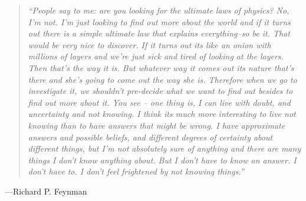 \begin{quote} 
\textit{``People say to me: are you looking for the ultimate laws of physics? No, I'm not. I'm just looking to find
out more about the world and if it turns out there is a simple ultimate law that explains everything--so be it. That would be very nice to discover. 
If it turns out its like an onion with millions of layers and we're just sick and tired of looking at the layers.
Then that's the way it is. But whatever way it comes out its nature that's there and she's going to come out the way she is. 
Therefore when we go to investigate it, we shouldn't pre-decide what we want to find out besides to find
out more about it.  You see -- one thing is, I can live with doubt, and uncertainty 
and not knowing. I think its much more interesting to live not knowing than to have answers that might be wrong. 
I have approximate answers and possible beliefs, and different degrees of certainty about different things, but I'm
not absolutely sure of anything and there are many things I don't know anything about. 
But I don't have to know an answer. I don't have to. I don't feel frightened by not knowing things.''}
\end{quote}
\begin{center} ---Richard P. Feynman \end{center}
